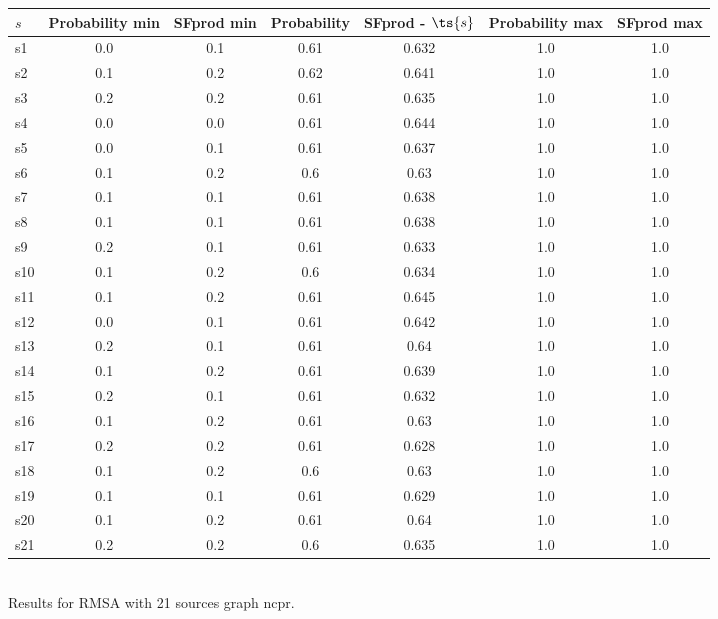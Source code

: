 \documentclass{article}
\begin{document}
\noindent\begin{tabular}{|l|c|c|c|c|c|c|}
\hline
$s$& Probability min & SFprod min & Probability & SFprod - $\ts{s}$ & Probability max & SFprod max\\
\hline
s1 &0.0 & 0.1 & 0.61 & 0.632 & 1.0 & 1.0\\
\hline
s2 &0.1 & 0.2 & 0.62 & 0.641 & 1.0 & 1.0\\
\hline
s3 &0.2 & 0.2 & 0.61 & 0.635 & 1.0 & 1.0\\
\hline
s4 &0.0 & 0.0 & 0.61 & 0.644 & 1.0 & 1.0\\
\hline
s5 &0.0 & 0.1 & 0.61 & 0.637 & 1.0 & 1.0\\
\hline
s6 &0.1 & 0.2 & 0.6 & 0.63 & 1.0 & 1.0\\
\hline
s7 &0.1 & 0.1 & 0.61 & 0.638 & 1.0 & 1.0\\
\hline
s8 &0.1 & 0.1 & 0.61 & 0.638 & 1.0 & 1.0\\
\hline
s9 &0.2 & 0.1 & 0.61 & 0.633 & 1.0 & 1.0\\
\hline
s10 &0.1 & 0.2 & 0.6 & 0.634 & 1.0 & 1.0\\
\hline
s11 &0.1 & 0.2 & 0.61 & 0.645 & 1.0 & 1.0\\
\hline
s12 &0.0 & 0.1 & 0.61 & 0.642 & 1.0 & 1.0\\
\hline
s13 &0.2 & 0.1 & 0.61 & 0.64 & 1.0 & 1.0\\
\hline
s14 &0.1 & 0.2 & 0.61 & 0.639 & 1.0 & 1.0\\
\hline
s15 &0.2 & 0.1 & 0.61 & 0.632 & 1.0 & 1.0\\
\hline
s16 &0.1 & 0.2 & 0.61 & 0.63 & 1.0 & 1.0\\
\hline
s17 &0.2 & 0.2 & 0.61 & 0.628 & 1.0 & 1.0\\
\hline
s18 &0.1 & 0.2 & 0.6 & 0.63 & 1.0 & 1.0\\
\hline
s19 &0.1 & 0.1 & 0.61 & 0.629 & 1.0 & 1.0\\
\hline
s20 &0.1 & 0.2 & 0.61 & 0.64 & 1.0 & 1.0\\
\hline
s21 &0.2 & 0.2 & 0.6 & 0.635 & 1.0 & 1.0\\
\hline
\end{tabular}\\

\noindent Results for RMSA with 21 sources graph ncpr.
\end{document}
